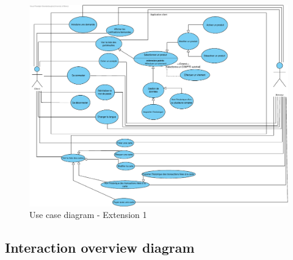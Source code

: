 \documentclass[]{report}
\begin{document}
\begin{figure}[h]
	\centering\includegraphics[width=\linewidth]{img/use-case-Extension-1.pdf}
	\caption{Use case diagram - Extension 1}
\end{figure}




\newpage

\subsection{Interaction overview diagram}
\end{document}
